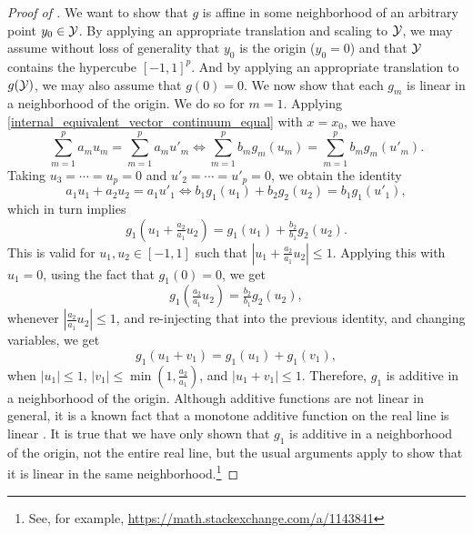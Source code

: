 \documentclass[twoside, 11pt]{article}
\begin{document}
\begin{proof}[Proof of ]
We want to show that $g$ is affine in some neighborhood of an arbitrary point $y_0 \in \mathcal{Y}$. By applying an appropriate translation and scaling to $\mathcal{Y}$, we may assume without loss of generality that $y_0$ is the origin ($y_0 = 0$) and that $\mathcal{Y}$ contains the hypercube $[-1,1]^p$. And by applying an appropriate translation to $g(\mathcal{Y})$, we may also assume that $g(0) = 0$.
%
We now show that each $g_m$ is linear in a neighborhood of the origin. We do so for $m=1$.
Applying \eqref{internal_equivalent_vector_continuum_equal} with $x = x_0$, we have
\begin{equation}
\sum_{m=1}^p a_m u_m = \sum_{m=1}^p a_m u'_m
\iff \sum_{m=1}^p b_m g_m(u_m) = \sum_{m=1}^p b_m g_m(u'_m).
\end{equation}
Taking $u_3 = \cdots = u_p = 0$ and $u'_2 = \cdots = u'_p = 0$, we obtain the identity
\begin{equation}
a_1 u_1 + a_2 u_2 = a_1 u'_1
\iff b_1 g_1(u_1) + b_2 g_2(u_2) = b_1 g_1(u'_1),
\end{equation}
which in turn implies
\begin{equation}
g_1(u_1 + \tfrac{a_2}{a_1} u_2)
= g_1(u_1) + \tfrac{b_2}{b_1} g_2(u_2).
\end{equation}
This is valid for $u_1, u_2 \in [-1,1]$ such that $|u_1 + \tfrac{a_2}{a_1} u_2| \le 1$.
Applying this with $u_1 = 0$, using the fact that $g_1(0) = 0$, we get
\begin{equation}
\label{g1g2}
g_1(\tfrac{a_2}{a_1} u_2)
= \tfrac{b_2}{b_1} g_2(u_2),
\end{equation}
whenever $|\tfrac{a_2}{a_1} u_2| \le 1$, and re-injecting that into the previous identity, and changing variables, we get
\begin{equation}
g_1(u_1 + v_1)
= g_1(u_1) + g_1(v_1),
\end{equation}
when $|u_1| \le 1$, $|v_1| \le \min(1, \tfrac{a_2}{a_1})$, and $|u_1+v_1| \le 1$.
Therefore, $g_1$ is additive in a neighborhood of the origin.
Although additive functions are not linear in general, it is a known fact that a monotone additive function on the real line is linear \cite[Ex 15 L-M]{bartle1964elements}. It is true that we have only shown that $g_1$ is additive in a neighborhood of the origin, not the entire real line, but the usual arguments apply to show that it is linear in the same neighborhood.\footnote{See, for example, \url{https://math.stackexchange.com/a/1143841}}  
\end{proof}
\end{document}
